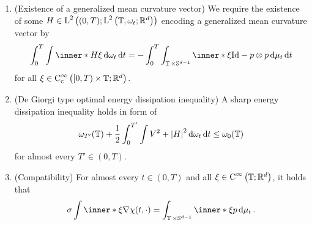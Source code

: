 \begin{definition}
\begin{enumerate}
		\item (Existence of a generalized mean curvature vector)
		We require the existence of some 
		$ H \in \operatorname{L}^{ 2 } \left( 
			( 0 , T ) ; 
			\operatorname{L}^{ 2 } \left(
				\operatorname{\mathbb{T}} , \omega_{ t } ; \mathbb{ R }^{ d }
			\right)
			\right) $
		encoding a generalized mean curvature vector by
		\begin{equation}
			\label{equation_varifold_mean_curvature}
			\int_{ 0 }^{ T }
				\int
					\inner*{ H }{ \xi }
				\dd{ \omega_{ t } }
			\dd{ t }
			=
			-
			\int_{ 0 }^{ T }
				\int_{ \flattorus \times \mathbb{ S }^{ d - 1 } }
					\inner*{ \xi }{ \mathrm{Id} - p \otimes p }
				\dd{ \mu_{ t } }
			\dd{ t }
		\end{equation}
		for all $ \xi \in \operatorname{C}_{ \mathrm{c} }^{ \infty } \left( [ 0, T ) 
		\times \operatorname{\mathbb{T}} ; \mathbb{ R }^{ d } \right) $.
		
		\item (De Giorgi type optimal energy dissipation inequality)
		A sharp energy dissipation inequality holds in form of
		\begin{equation}
			\label{equation_varifold_de_giorgi_inequality}
			\omega_{ T' } ( \operatorname{\mathbb{T}} )
			+
			\frac{ 1 }{ 2 }
			\int_{ 0 }^{ T' }
				\int
					V^{ 2 }
					+
					\abs{ H }^{ 2 }
				\dd{ \omega_{ t } }
			\dd{ t }
			\leq
			\omega_{ 0 } ( \operatorname{\mathbb{T}} )
		\end{equation}
		for almost every $ T' \in ( 0 , T ) $.
		
		\item (Compatibility)
		For almost every $ t \in ( 0 , T ) $ and all $ \xi \in \operatorname{C}^{ 
		\infty } \left( \operatorname{\mathbb{T}} ; \mathbb{ R }^{ d } \right) $, it holds that
		\begin{equation}
			\label{equation_varifold_compatibility}
			\sigma
			\int
				\inner*{ \xi }
				{ \nabla \chi ( t , \cdot ) }
			=
			\int_{ \flattorus \times \mathbb{ S }^{ d - 1 } }
				\inner*{ \xi }{ p }
			\dd{ \mu_{ t } }.
		\end{equation}
	\end{enumerate}
\end{definition}

